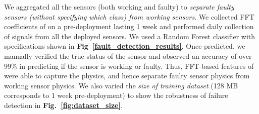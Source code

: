 We aggregated all the sensors (both working and faulty) to \textit{separate faulty sensors (without specifying which class) from working sensors}. 
%
We collected FFT coefficients of \aout on a pre-deployment lasting 1 week and performed daily collection of \aout signals from all the deployed sensors. 
%
%
We used a Random Forest classifier with specifications shown in {\bfseries Fig~\ref{fault_detection_results}}. 
%
Once predicted, we manually verified the true status of the sensor and observed an accuracy of over 99\% in predicting if the sensor is working or faulty. 
%
Thus, FFT-based features of \aout were able to capture the physics, and hence separate faulty sensor physics from working sensor physics.
%
We also varied the \textit{size of training dataset} (128 MB corresponds to 1 week pre-deployment) to show the robustness of failure detection in {\bfseries Fig.~\ref{fig:dataset_size}}.

